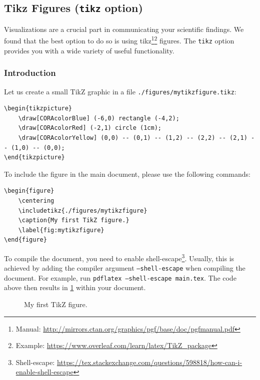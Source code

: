 \documentclass{article}
\begin{document}
\subsection{Tikz Figures (\texttt{tikz} option)}\label{sec:tikz}

Visualizations are a crucial part in communicating your scientific findings.
We found that the best option to do so is using tikz\footnote{Manual: \url{http://mirrors.ctan.org/graphics/pgf/base/doc/pgfmanual.pdf}}\footnote{Example: \url{https://www.overleaf.com/learn/latex/TikZ_package}} figures.
The \texttt{tikz} option provides you with a wide variety of useful functionality.

\subsubsection{Introduction}

Let us create a small TikZ graphic in a file \texttt{./figures/mytikzfigure.tikz}:

\begin{verbatim}
\begin{tikzpicture}
    \draw[CORAcolorBlue] (-6,0) rectangle (-4,2);
    \draw[CORAcolorRed] (-2,1) circle (1cm);
    \draw[CORAcolorYellow] (0,0) -- (0,1) -- (1,2) -- (2,2) -- (2,1) -- (1,0) -- (0,0);
\end{tikzpicture}
\end{verbatim}

To include the figure in the main document, please use the following commands:
\begin{verbatim}
\begin{figure}
    \centering
    \includetikz{./figures/mytikzfigure}
    \caption{My first TikZ figure.}
    \label{fig:mytikzfigure}
\end{figure}
\end{verbatim}

To compile the document, you need to enable shell-escape\footnote{Shell-escape: \url{https://tex.stackexchange.com/questions/598818/how-can-i-enable-shell-escape}}.
Usually, this is achieved by adding the compiler argument \texttt{--shell-escape} when compiling the document.
For example, run \texttt{pdflatex --shell-escape main.tex}.
The code above then results in \cref{fig:mytikzfigure} within your document.
\begin{figure}[h!]
  \centering
  \caption{My first TikZ figure.}
  \label{fig:mytikzfigure}
\end{figure}
\end{document}
